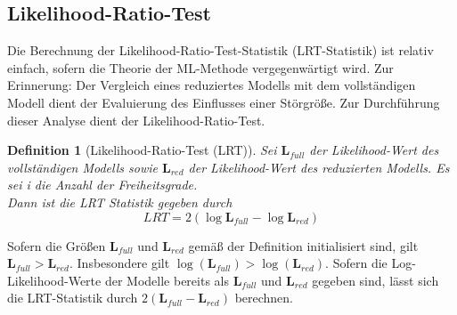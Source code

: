 \documentclass[%
thesis=student,%
coverpage=false,%
titlepage=false,%
headmarks=true, %
german,%
font=libertine, %
math=newpxtx, %
BCOR=5mm,%
coverBCOR=11mm%
]{tumbook}
\theoremstyle{break}
\newtheorem{definition}{Definition}[section]
\begin{document}
\subsection{Likelihood-Ratio-Test}
Die Berechnung der Likelihood-Ratio-Test-Statistik (LRT-Statistik) ist relativ einfach, sofern die Theorie der ML-Methode vergegenwärtigt wird. Zur Erinnerung: Der Vergleich eines reduziertes Modells mit dem vollständigen Modell dient der Evaluierung des Einflusses einer Störgröße. Zur Durchführung dieser Analyse dient der Likelihood-Ratio-Test.
\begin{definition}[Likelihood-Ratio-Test (LRT)] 
	Sei $\mathbf{L}_{full}$ der Likelihood-Wert des vollständigen Modells sowie $\mathbf{L}_{red}$ der Likelihood-Wert des reduzierten Modells. Es sei i die Anzahl der Freiheitsgrade.\\
	Dann ist die LRT Statistik gegeben durch 
	$$ LRT = 2(\log \mathbf{L}_{full}- \log \mathbf{L}_{red}) $$ 
\end{definition} \noindent
Sofern die Größen $\mathbf{L}_{full}$ und $\mathbf{L}_{red}$ gemäß der Definition initialisiert sind, gilt $\mathbf{L}_{full} > \mathbf{L}_{red}$. Insbesondere gilt $\log(\mathbf{L}_{full}) > \log(\mathbf{L}_{red})$.
Sofern die Log-Likelihood-Werte der Modelle bereits als $\mathbf{L}_{full}$ und $\mathbf{L}_{red}$ gegeben sind, lässt sich die LRT-Statistik durch $2(\mathbf{L}_{full} - \mathbf{L}_{red})$ berechnen. \\


\end{document}
